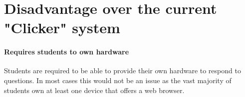 \documentclass[10pt]{report}
\begin{document}
	\section*{Disadvantage over the current "Clicker" system}
	\paragraph{Requires students to own hardware}
	Students are required to be able to provide their own hardware to respond to questions. In most cases
	this would not be an issue as the vast majority of students own at least one device that offers a web
	browser.
	
	\iffalse
	  I counteracted these issues by making an easy
	to use web application where students can respond to questions using hardware they already have such
	as a smartphone, a tablet or a laptop.  This also has the added advantage of allowing students to
	respond to questions from anywhere in the world, they do not have to be in the same room as 
	\fi
\end{document}
